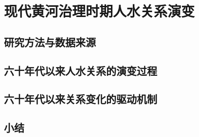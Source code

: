 \chapter{现代黄河治理时期人\textendash{}水关系演变}\label{cha:4}


\section{研究方法与数据来源}\label{ch4:methods}


\section{六十年代以来人\textendash{}水关系的演变过程}\label{ch4:process}


\section{六十年代以来关系变化的驱动机制}\label{ch4:mechanism}




\section{小结}\label{ch4:summary}

